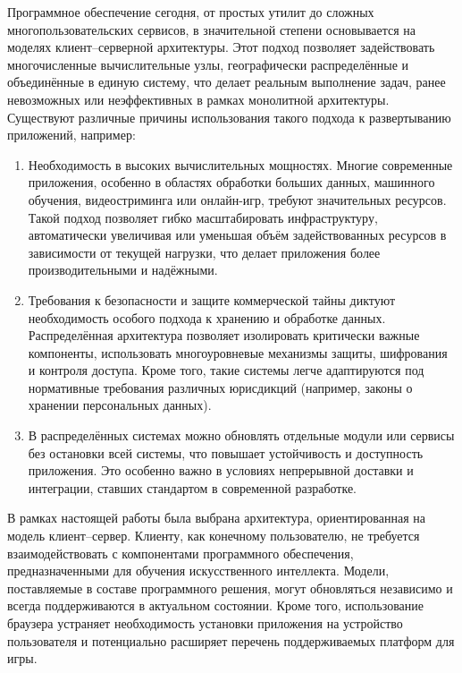 Программное обеспечение сегодня, от простых утилит до сложных многопользовательских сервисов, в значительной степени основывается на моделях клиент–серверной архитектуры. Этот подход позволяет задействовать многочисленные вычислительные узлы, географически распределённые и объединённые в единую систему, что делает реальным выполнение задач, ранее невозможных или неэффективных в рамках монолитной архитектуры. Существуют различные причины использования такого подхода к развертыванию приложений, например:

\begin{enumerate}
    \item Необходимость в высоких вычислительных мощностях. Многие современные приложения, особенно в областях обработки больших данных, машинного обучения, видеостриминга или онлайн-игр, требуют значительных ресурсов. Такой подход позволяет гибко масштабировать инфраструктуру, автоматически увеличивая или уменьшая объём задействованных ресурсов в зависимости от текущей нагрузки, что делает приложения более производительными и надёжными.
    \item Требования к безопасности и защите коммерческой тайны диктуют необходимость особого подхода к хранению и обработке данных. Распределённая архитектура позволяет изолировать критически важные компоненты, использовать многоуровневые механизмы защиты, шифрования и контроля доступа. Кроме того, такие системы легче адаптируются под нормативные требования различных юрисдикций (например, законы о хранении персональных данных).
    \item В распределённых системах можно обновлять отдельные модули или сервисы без остановки всей системы, что повышает устойчивость и доступность приложения. Это особенно важно в условиях непрерывной доставки и интеграции, ставших стандартом в современной разработке.
\end{enumerate}

В рамках настоящей работы была выбрана архитектура, ориентированная на модель клиент–сервер. Клиенту, как конечному пользователю, не требуется взаимодействовать с компонентами программного обеспечения, предназначенными для обучения искусственного интеллекта. Модели, поставляемые в составе программного решения, могут обновляться независимо и всегда поддерживаются в актуальном состоянии. Кроме того, использование браузера устраняет необходимость установки приложения на устройство пользователя и потенциально расширяет перечень поддерживаемых платформ для игры.
